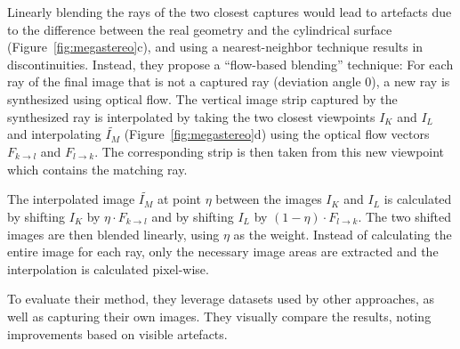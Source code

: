 Linearly blending the rays of the two closest captures would lead to artefacts due to the difference between the real geometry and the cylindrical surface (Figure~\ref{fig:megastereo}c), and using a nearest-neighbor technique results in discontinuities. Instead, they propose a ``flow-based blending'' technique: For each ray of the final image that is not a captured ray (deviation angle 0), a new ray is synthesized using optical flow. The vertical image strip captured by the synthesized ray is interpolated by taking the two closest viewpoints $I_K$ and $I_L$ and interpolating $\widetilde{I_M}$ (Figure~\ref{fig:megastereo}d) using the optical flow vectors $F_{k\rightarrow l}$ and $F_{l\rightarrow k}$.  The corresponding strip is then taken from this new viewpoint which contains the matching ray.



The interpolated image $\widetilde{I_M}$ at point $\eta$ between the images $I_K$ and $I_L$ is calculated by shifting $I_K$ by $\eta \cdot F_{k\rightarrow l}$ and by shifting $I_L$ by $(1 - \eta) \cdot F_{l\rightarrow k}$. The two shifted images are then blended linearly, using $\eta$ as the weight. Instead of calculating the entire image for each ray, only the necessary image areas are extracted and the interpolation is calculated pixel-wise.

To evaluate their method, they leverage datasets used by other approaches, as well as capturing their own images. They visually compare the results, noting improvements based on visible artefacts.

